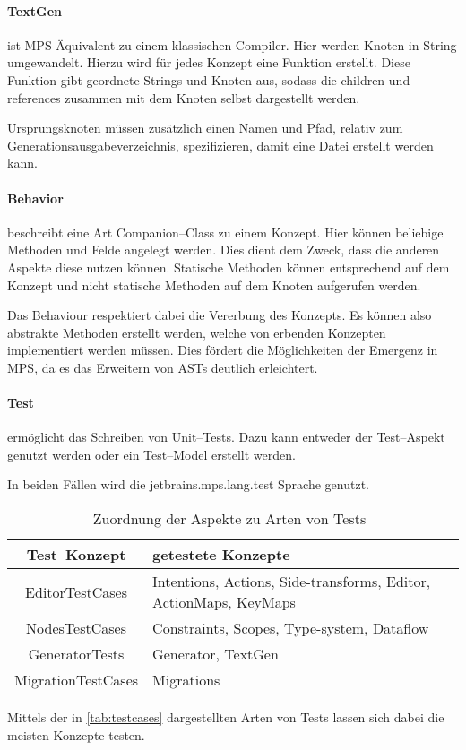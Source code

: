 \paragraph{TextGen} ist \ac{MPS} Äquivalent zu einem klassischen Compiler.
Hier werden Knoten in String umgewandelt.
Hierzu wird für jedes Konzept eine Funktion erstellt.
Diese Funktion gibt geordnete Strings und Knoten aus, sodass die {\ttfamily children} und {\ttfamily references} zusammen mit dem Knoten selbst dargestellt werden.

Ursprungsknoten müssen zusätzlich einen Namen und Pfad, relativ zum Generationsausgabeverzeichnis, spezifizieren, damit eine Datei erstellt werden kann.

\paragraph{Behavior} beschreibt eine Art Companion--Class zu einem Konzept.
Hier können beliebige Methoden und Felde angelegt werden.
Dies dient dem Zweck, dass die anderen Aspekte diese nutzen können.
Statische Methoden können entsprechend auf dem Konzept und nicht statische Methoden auf dem Knoten aufgerufen werden.

Das Behaviour respektiert dabei die Vererbung des Konzepts.
Es können also abstrakte Methoden erstellt werden, welche von erbenden Konzepten implementiert werden müssen.
Dies fördert die Möglichkeiten der Emergenz in \ac{MPS}, da es das Erweitern von \acp{AST} deutlich erleichtert.

\paragraph{Test} ermöglicht das Schreiben von Unit--Tests.
Dazu kann entweder der Test--Aspekt genutzt werden oder ein Test--Model erstellt werden.

In beiden Fällen wird die {\ttfamily jetbrains.mps.lang.test} Sprache genutzt.
\begin{table}[ht]
    \centering
    \begin{tabular}{|c|p{\textwidth-5cm}|}
        \hline
        \textbf{Test--Konzept}    & \textbf{getestete Konzepte}                                       \\
        \hline
        \hline
        {\ttfamily EditorTestCases}    & Intentions, Actions, Side-transforms, Editor, ActionMaps, KeyMaps \\
        \hline
        {\ttfamily NodesTestCases}     & Constraints, Scopes, Type-system, Dataflow                        \\
        \hline
        {\ttfamily GeneratorTests}     & Generator, TextGen                                                \\
        \hline
        {\ttfamily MigrationTestCases} & Migrations                                                        \\
        \hline
    \end{tabular}
    \caption{Zuordnung der Aspekte zu Arten von Tests~\autocite{jetbrains-sro-no-dateE}}
    \label{tab:testcases}
\end{table}
Mittels der in \autoref{tab:testcases} dargestellten Arten von Tests lassen sich dabei die meisten Konzepte testen.

